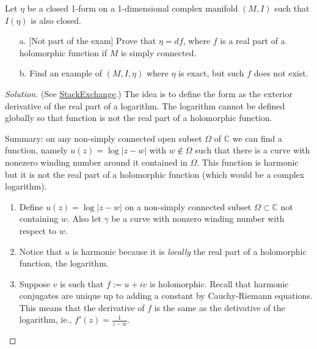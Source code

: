 \begin{manualexercise}{1.7}
	Let $\eta$ be a closed 1-form on a 1-dimensional complex manifold $(M,I)$ such that $I(\eta)$ is also closed.

	\begin{enumerate}
		\item[a.] [Not part of the exam] Prove that $\eta=df$, where $f$ is a real part of a holomorphic function if $M$ is simply connected.

		\item[b.] Find an example of $(M,I,\eta)$ where $\eta$ is exact, but such $f$ does not exist.
	\end{enumerate}
\end{manualexercise}

\begin{proof}[Solution]\leavevmode 

	(See \href{https://math.stackexchange.com/questions/711950/show-omega-is-simply-connected-if-every-harmonic-function-has-a-conjugate}{StackExchange}.) The idea is to define the form as the exterior derivative of the real part of a logarithm. The logarithm cannot be defined globally so that function is not the real part of a holomorphic function.

	Summary: on any non-simply connected open subset $\Omega$ of $\mathbb{C}$ we can find a function, namely $u(z)=\log |z-w|$ with $w\notin \Omega$ such that there is a curve with nonezero winding number around it contained in $\Omega$. This function is harmonic but it is not the real part of a holomorphic function (which would be a complex logarithm).

	\begin{enumerate}[label=\textbf{Step \arabic*}]
		\item  Define $u(z)=\log|z-w|$ on a non-simply connected subset $\Omega\subset \mathbb{C}$ not containing $w$. Also let $\gamma$ be a curve with nonzero winding number with respect to $w$.
		
		\item Notice that $u$ is harmonic because it is \textit{locally} the real part of a holomorphic function, the logarithm.

		\item Suppose $v$ is such that $f:=u+iv$ is holomorphic. Recall that harmonic conjugates are unique up to adding a constant by Cauchy-Riemann equations. This means that the derivative of $f$ is the same as the detivative of the logarithm, ie., $f'(z)=\frac{1}{z-w}$.


\end{enumerate}
\end{proof}
